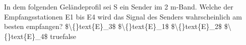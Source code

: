     {In dem folgenden Geländeprofil sei S ein Sender im 2 m-Band. Welche der Empfangsstationen E1 bis E4 wird das Signal des Senders wahrscheinlich am besten empfangen?}
    {\$\textbackslash\{\}text\{E\}\_3\$}
    {\$\textbackslash\{\}text\{E\}\_1\$}
    {\$\textbackslash\{\}text\{E\}\_2\$}
    {\$\textbackslash\{\}text\{E\}\_4\$}
    {true}{false}